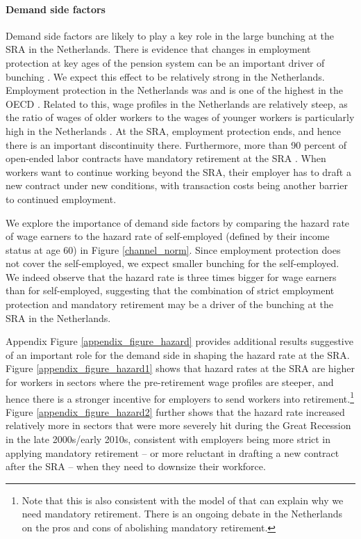 \documentclass[12pt,a4paper]{article}
\begin{document}
\paragraph{Demand side factors} Demand side factors are likely to play a key role in the large bunching at the SRA in the Netherlands. There is evidence that changes in employment protection at key ages of the pension system can be an important driver of bunching \citep{rabate2019can}. We expect this effect to be relatively strong in the Netherlands. Employment protection in the Netherlands was and is one of the highest in the OECD \citep{oecd_2020}. Related to this, wage profiles in the Netherlands are relatively steep, as the ratio of wages of older workers to the wages of younger workers is particularly high in the Netherlands \citep{oecd_2014}. At the SRA, employment protection ends, and hence there is an important discontinuity there. Furthermore, more than 90 percent of open-ended labor contracts have mandatory retirement at the SRA \citep[92\% in 2014, according to the][]{oecd_2014}. When workers want to continue working beyond the SRA, their employer has to draft a new contract under new conditions, with transaction costs being another barrier to continued employment.

We explore the importance of demand side factors by comparing the hazard rate of wage earners to the hazard rate of self-employed (defined by their income status at age 60) in Figure \ref{channel_norm}. Since employment protection does not cover the self-employed, we expect smaller bunching for the self-employed. We indeed observe that the hazard rate is three times bigger for wage earners than for self-employed, suggesting that the combination of strict employment protection and mandatory retirement may be a driver of the bunching at the SRA in the Netherlands. 

Appendix Figure \ref{appendix_figure_hazard} provides additional results suggestive of an important role for the demand side in shaping the hazard rate at the SRA. Figure \ref{appendix_figure_hazard1} shows that hazard rates at the SRA are higher for workers in sectors where the pre-retirement wage profiles are steeper, and hence there is a stronger incentive for employers to send workers into retirement.\footnote{Note that this is also consistent with the model of \cite{lazear1979there} that can explain why we need mandatory retirement. There is an ongoing debate in the Netherlands on the pros and cons of abolishing mandatory retirement.} Figure \ref{appendix_figure_hazard2} further shows that the hazard rate increased relatively more in sectors that were more severely hit during the Great Recession in the late 2000s/early 2010s, consistent with employers being more strict in applying mandatory retirement -- or more reluctant in drafting a new contract after the SRA -- when they need to downsize their workforce.
\end{document}
